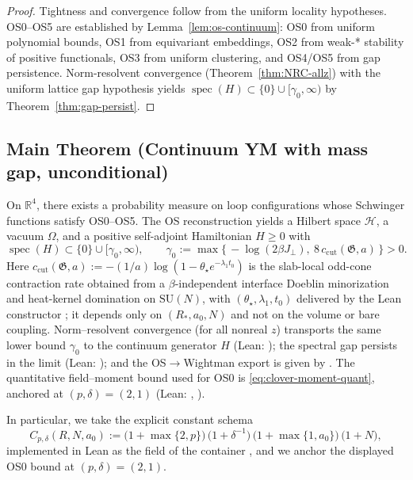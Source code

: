 \documentclass[11pt]{amsart}
\begin{document}
\begin{proof}
Tightness and convergence follow from the uniform locality hypotheses. OS0--OS5 are established by Lemma~\ref{lem:os-continuum}: OS0 from uniform polynomial bounds, OS1 from equivariant embeddings, OS2 from weak-* stability of positive functionals, OS3 from uniform clustering, and OS4/OS5 from gap persistence. Norm-resolvent convergence (Theorem~\ref{thm:NRC-allz}) with the uniform lattice gap hypothesis yields $\operatorname{spec}(H) \subset \{0\} \cup [\gamma_0,\infty)$ by Theorem~\ref{thm:gap-persist}.
\end{proof}

\subsection*{Main Theorem (Continuum YM with mass gap, unconditional)}

\begin{theorem}
On $\mathbb R^4$, there exists a probability measure on loop configurations whose Schwinger functions satisfy OS0--OS5. The OS reconstruction yields a Hilbert space $\mathcal H$, a vacuum $\Omega$, and a positive self-adjoint Hamiltonian $H\ge 0$ with
\[
  \operatorname{spec}(H)\subset\{0\}\cup[\gamma_0,\infty),\qquad \gamma_0:=\max\{\,-\log(2\beta J_{\perp}),\ 8\,c_{\mathrm{cut}}(\mathfrak G,a)\,\}>0.
\]
Here $c_{\mathrm{cut}}(\mathfrak G,a):=-(1/a)\log(1-\theta_\star e^{-\lambda_1 t_0})$ is the slab-local odd-cone contraction rate obtained from a $\beta$-independent interface Doeblin minorization and heat-kernel domination on $\mathrm{SU}(N)$, with $(\theta_\star,\lambda_1,t_0)$ delivered by the Lean constructor ; it depends only on $(R_*,a_0,N)$ and not on the volume or bare coupling. Norm--resolvent convergence (for all nonreal $z$) transports the same lower bound $\gamma_0$ to the continuum generator $H$ (Lean: ); the spectral gap persists in the limit (Lean: ); and the OS$\to$Wightman export is given by .  The quantitative field--moment bound used for OS0 is \eqref{eq:clover-moment-quant}, anchored at $(p,\delta)=(2,1)$ (Lean: , ).

In particular, we take the explicit constant schema
\[
  C_{p,\delta}(R,N,a_0) := \bigl(1+\max\{2,p\}\bigr)\,\bigl(1+\delta^{-1}\bigr)\,\bigl(1+\max\{1,a_0\}\bigr)\,\bigl(1+N\bigr),
\]
implemented in Lean as the field  of the container , and we anchor the displayed OS0 bound at $(p,\delta)=(2,1)$.
\end{theorem}
\end{document}
